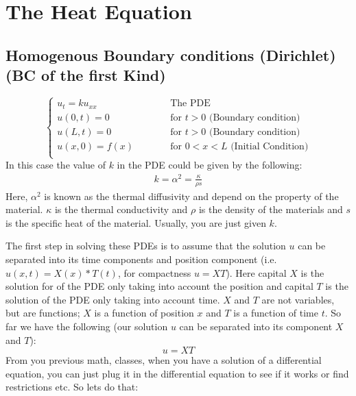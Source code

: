 \documentclass[11pt]{article}
\begin{document}
\section{The Heat Equation}
\subsection{Homogenous Boundary conditions (Dirichlet) (BC of the first Kind)}

\begin{equation}
	\begin{cases}
    u_t = ku_{xx} &\quad\quad\quad\text{The PDE}\\
    u(0,t)=0 &\quad\quad\quad\text{for $t>0$ (Boundary condition)}\\
    u(L,t) =0 &\quad\quad\quad\text{for $t>0$ (Boundary condition)}\\
    u(x,0)  = f(x) &\quad\quad\quad\text{for $0<x<L$ (Initial Condition)}\\
  \end{cases}
\end{equation}
In this case the value of $k$ in the PDE could be given by the following:
\begin{align}
	k=\alpha^{2}=\frac{\kappa}{\rho s}
\end{align}
Here, $\alpha^2$ is known as the thermal diffusivity and depend on the property of the material. $\kappa$ is the thermal conductivity and $\rho$ is the density of the materials and $s$ is the specific heat of the material. Usually, you are just given $k$.

The first step in solving these PDEs is to assume that the solution $u$ can be separated into its time components and position component (i.e. $u(x,t)=X(x)*T(t)$, for compactness $u=XT$). Here capital $X$ is the solution for of the PDE only taking into account the position and capital $T$ is the solution of the PDE only taking into account time. $X$ and $T$ are not variables, but are functions; $X$ is a function of position $x$ and $T$ is a function of time $t$. So far we have the following (our solution $u$ can be separated into its component $X$ and $T$):
\begin{equation}
	u=XT
\end{equation}
From you previous math, classes, when you have a solution of a differential equation, you can just plug it in the differential equation to see if it works or find restrictions etc. So lets do that:
\end{document}
